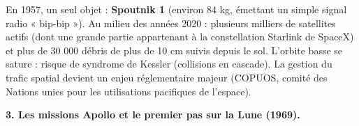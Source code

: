 \documentclass[11pt]{article}
\newcommand{\cle}[1]{{\popxbold\color{popdark}#1}}
\begin{document}
\begin{exemplebox}
En 1957, un seul objet : \textbf{Spoutnik 1} (environ 84 kg, émettant un simple signal radio « bip-bip »).
Au milieu des années 2020 : plusieurs milliers de satellites actifs (dont une grande partie appartenant à la constellation Starlink de SpaceX) et plus de 30 000 débris de plus de 10 cm suivis depuis le sol. L'orbite basse se sature : risque de \cle{syndrome de Kessler} (collisions en cascade). La gestion du trafic spatial devient un enjeu réglementaire majeur (COPUOS, comité des Nations unies pour les utilisations pacifiques de l'espace).
\end{exemplebox}

\textbf{3. Les missions Apollo et le premier pas sur la Lune (1969).}
\end{document}
